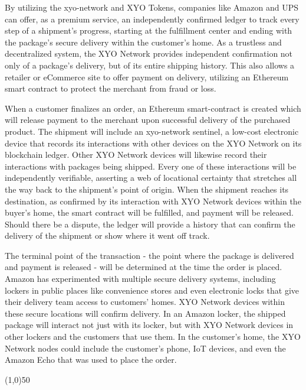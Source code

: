 \documentclass{article}
\begin{document}
By utilizing the \Gls{xyo-network} and XYO Tokens, companies like Amazon and UPS can offer, as a premium service, an independently confirmed ledger to track every step of a shipment's progress, starting at the fulfillment center and ending with the package's secure delivery within the customer's home. As a trustless and decentralized system, the XYO Network provides independent confirmation not only of a package's delivery, but of its entire shipping history. This also allows a retailer or eCommerce site to offer payment on delivery, utilizing an Ethereum smart contract to protect the merchant from fraud or loss.

When a customer finalizes an order, an Ethereum \gls{smart-contract} is created which will release payment to the merchant upon successful delivery of the purchased product. The shipment will include an \Gls{xyo-network} \Gls{sentinel}, a low-cost electronic device that records its interactions with other devices on the XYO Network on its blockchain ledger. Other XYO Network devices will likewise record their interactions with packages being shipped. Every one of these interactions will be independently verifiable, asserting a web of locational certainty that stretches all the way back to the shipment's point of origin. When the shipment reaches its destination, as confirmed by its interaction with XYO Network devices within the buyer's home, the smart contract will be fulfilled, and payment will be released. Should there be a dispute, the ledger will provide a history that can confirm the delivery of the shipment or show where it went off track.

The terminal point of the transaction - the point where the package is delivered and payment is released - will be determined at the time the order is placed. Amazon has experimented with multiple secure delivery systems, including lockers in public places like convenience stores and even electronic locks that give their delivery team access to customers' homes. XYO Network devices within these secure locations will confirm delivery. In an Amazon locker, the shipped package will interact not just with its locker, but with XYO Network devices in other lockers and the customers that use them. In the customer's home, the XYO Network nodes could include the customer's phone, IoT devices, and even the Amazon Echo that was used to place the order.




\begin{center}
\line(1,0){50}
\end{center}
\end{document}
